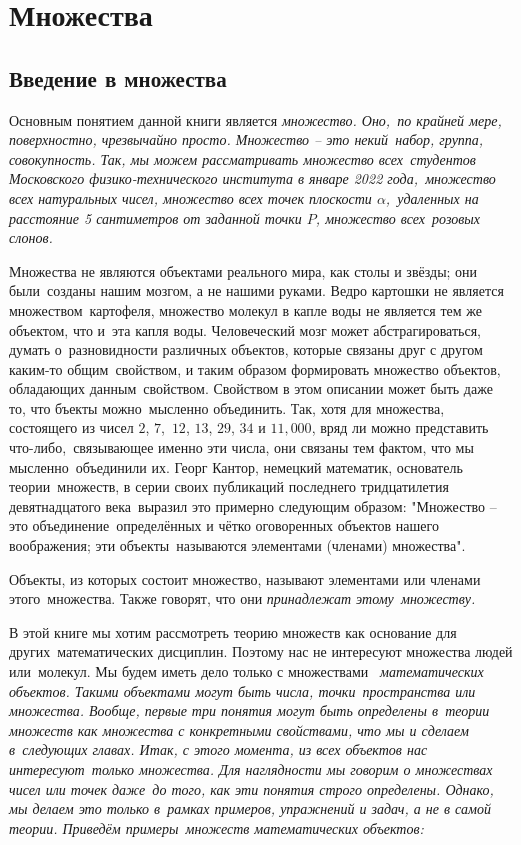 \documentclass[a4paper, 12pt]{extreport}
\begin{document}
\chapter{Множества}

\section{Введение в множества}

Основным понятием данной книги является \itshape множество\normalfont{}. Оно,\
по крайней мере, поверхностно, чрезвычайно просто. Множество -- это некий\
набор, группа, совокупность. Так, мы можем рассматривать множество всех\
студентов Московского физико-технического института в январе 2022 года,\
множество всех натуральных чисел, множество всех точек плоскости $\alpha$,\
удаленных на расстояние 5 сантиметров от заданной точки $P$, множество всех\
розовых слонов. \par
Множества не являются объектами реального мира, как столы и звёзды; они были\
созданы нашим мозгом, а не нашими руками. Ведро картошки не является множеством\
картофеля, множество молекул в капле воды не является тем же объектом, что и\
эта капля воды. Человеческий мозг может абстрагироваться, думать о\
разновидности различных объектов, которые связаны друг с другом каким-то общим\
свойством, и таким образом формировать множество объектов, обладающих данным\
свойством. Свойством в этом описании может быть даже то, что бъекты можно\
мысленно объединить. Так, хотя для множества, состоящего из чисел $2$, $7$,\
$12$, $13$, $29$, $34$ и $11,000$, вряд ли можно представить что-либо,\
связывающее именно эти числа, они связаны тем фактом, что мы мысленно\
объединили их. Георг Кантор, немецкий математик, основатель теории\
множеств, в серии своих публикаций последнего тридцатилетия девятнадцатого века\
выразил это примерно следующим образом: "Множество -- это объединение\
определённых и чётко оговоренных объектов нашего воображения; эти объекты\
называются элементами (членами) множества". \par
Объекты, из которых состоит множество, называют элементами или членами этого\
множества. Также говорят, что они \itshape принадлежат\normalfont{} этому\
множеству. \par
В этой книге мы хотим рассмотреть теорию множеств как основание для других\
математических дисциплин. Поэтому нас не интересуют множества людей или\
молекул. Мы будем иметь дело только с множествами \itshape\
математических\normalfont{} объектов. Такими объектами могут быть числа, точки\
пространства или множества. Вообще, первые три понятия могут быть определены в\
теории множеств как множества с конкретными свойствами, что мы и сделаем в\
следующих главах. Итак, с этого момента, из всех объектов нас интересуют\
только множества. Для наглядности мы говорим о множествах чисел или точек даже\
до того, как эти понятия строго определены. Однако, мы делаем это только в\
рамках примеров, упражнений и задач, а не в самой теории. Приведём примеры\
множеств математических объектов: \par
\end{document}

